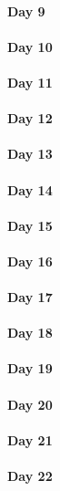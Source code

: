 \documentclass[UTF8,a4paper,8pt]{ctexart}
\begin{document}
 	 \paragraph{Day 9       \quad     }
 	 \paragraph{Day 10      \quad     }
 	 \paragraph{Day 11      \quad     }
 	 \paragraph{Day 12      \quad     }
 	 \paragraph{Day 13      \quad     }
 	 \paragraph{Day 14      \quad     }
 	 \paragraph{Day 15      \quad     }
 	 \paragraph{Day 16      \quad     }
 	 \paragraph{Day 17      \quad     }
 	 \paragraph{Day 18      \quad     }
 	 \paragraph{Day 19      \quad     }
 	 \paragraph{Day 20      \quad     }
 	 \paragraph{Day 21      \quad     }
 	 \paragraph{Day 22      \quad     }
\end{document}
